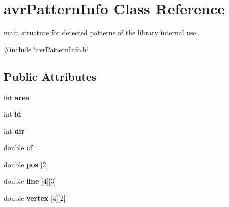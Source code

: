 \hypertarget{classavr_pattern_info}{\section{avr\-Pattern\-Info Class Reference}
\label{classavr_pattern_info}
}


main structure for detected patterns of the library internal use.  




{\ttfamily \#include \char`\"{}avr\-Pattern\-Info.\-h\char`\"{}}

\subsection*{Public Attributes}
\begin{DoxyCompactItemize}
\item 
\hypertarget{classavr_pattern_info_a3a0093ce9ac05bb2745a1fa682a23438}{int {\bfseries area}}\label{classavr_pattern_info_a3a0093ce9ac05bb2745a1fa682a23438}

\item 
\hypertarget{classavr_pattern_info_af72af1ef28567a03f9c14790e50caba3}{int {\bfseries id}}\label{classavr_pattern_info_af72af1ef28567a03f9c14790e50caba3}

\item 
\hypertarget{classavr_pattern_info_a1dd7c2ee70ebee15851798a6e140d2aa}{int {\bfseries dir}}\label{classavr_pattern_info_a1dd7c2ee70ebee15851798a6e140d2aa}

\item 
\hypertarget{classavr_pattern_info_a3890f6ae1571597f3ce6a18ce88f07a5}{double {\bfseries cf}}\label{classavr_pattern_info_a3890f6ae1571597f3ce6a18ce88f07a5}

\item 
\hypertarget{classavr_pattern_info_a9a6b2c6270b15d0df992c1b97eb1ebd9}{double {\bfseries pos} \mbox{[}2\mbox{]}}\label{classavr_pattern_info_a9a6b2c6270b15d0df992c1b97eb1ebd9}

\item 
\hypertarget{classavr_pattern_info_a877d45bbae69bc4a70fcd83fed56c316}{double {\bfseries line} \mbox{[}4\mbox{]}\mbox{[}3\mbox{]}}\label{classavr_pattern_info_a877d45bbae69bc4a70fcd83fed56c316}

\item 
\hypertarget{classavr_pattern_info_a81b663e52fb6304d7a8803ba1149d2f8}{double {\bfseries vertex} \mbox{[}4\mbox{]}\mbox{[}2\mbox{]}}\label{classavr_pattern_info_a81b663e52fb6304d7a8803ba1149d2f8}

\end{DoxyCompactItemize}


